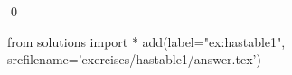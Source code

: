 
\begin{ex} 
  \label{ex:hastable1}
  
  \qed
\end{ex} 
\begin{python0}
from solutions import *
add(label="ex:hastable1",
    srcfilename='exercises/hastable1/answer.tex') 
\end{python0}
